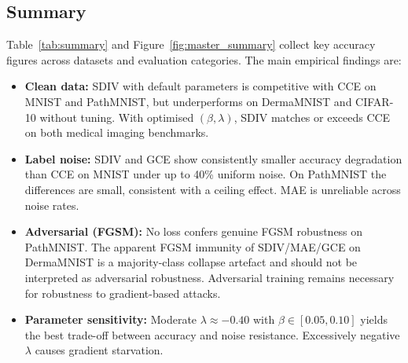 \subsection{Summary}
\label{sec:exp_summary}

Table~\ref{tab:summary} and Figure~\ref{fig:master_summary} collect key accuracy figures across datasets and
evaluation categories.
The main empirical findings are:
\begin{itemize}[leftmargin=*,itemsep=2pt]
  \item \textbf{Clean data:} SDIV with default parameters is competitive
        with CCE on MNIST and PathMNIST, but underperforms on DermaMNIST
        and CIFAR-10 without tuning. With optimised $(\beta,\lambda)$,
        SDIV matches or exceeds CCE on both medical imaging benchmarks.

  \item \textbf{Label noise:} SDIV and GCE show consistently smaller
        accuracy degradation than CCE on MNIST under up to 40\% uniform
        noise. On PathMNIST the differences are small, consistent with
        a ceiling effect. MAE is unreliable across noise rates.

  \item \textbf{Adversarial (FGSM):} No loss confers genuine FGSM
        robustness on PathMNIST. The apparent FGSM immunity of SDIV/MAE/GCE
        on DermaMNIST is a majority-class collapse artefact and should
        not be interpreted as adversarial robustness. Adversarial training
        remains necessary for robustness to gradient-based attacks.

  \item \textbf{Parameter sensitivity:} Moderate $\lambda \approx -0.40$
        with $\beta \in [0.05, 0.10]$ yields the best trade-off between
        accuracy and noise resistance. Excessively negative $\lambda$
        causes gradient starvation.
\end{itemize}
